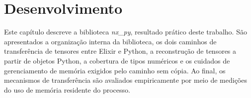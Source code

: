 
\chapter{Desenvolvimento}\label{cap:desenvolvimento}

Este capítulo descreve a biblioteca \textit{nx\_py}, resultado prático deste trabalho. São apresentados a organização interna da biblioteca, os dois caminhos de transferência de tensores entre Elixir e Python, a reconstrução de tensores a partir de objetos Python, a cobertura de tipos numéricos e os cuidados de gerenciamento de memória exigidos pelo caminho sem cópia. Ao final, os mecanismos de transferência são avaliados empiricamente por meio de medições do uso de memória residente do processo.
